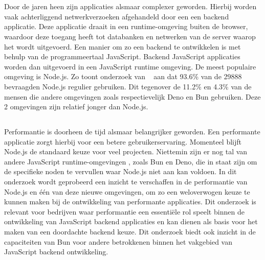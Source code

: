
\chapter{}%
\label{ch:inleiding}


Door de jaren heen zijn applicaties alsmaar complexer geworden. Hierbij worden vaak achterliggend netwerkverzoeken afgehandeld door een 
een backend applicatie. Deze applicatie draait in een runtime-omgeving buiten de browser, 
waardoor deze toegang heeft tot databanken en netwerken van de server waarop het wordt uitgevoerd.
Een manier om zo een backend te ontwikkelen is met behulp van de programmeertaal JavaScript. 
Backend JavaScript applicaties worden dan uitgevoerd in een JavaScript runtime omgeving.
De meest populaire omgeving is Node.js. Zo toont onderzoek van ~\textcite{Greif2022} aan dat 93.6\% van de 29888 bevraagden Node.js 
regulier gebruiken.
Dit tegenover de 11.2\% en 4.3\% van de mensen die andere omgevingen zoals respectievelijk Deno en Bun gebruiken.
Deze 2 omgevingen zijn relatief jonger dan Node.js.

\section{}%
\label{sec:probleemstelling}

Performantie is doorheen de tijd alsmaar belangrijker geworden. 
Een performante applicatie zorgt hierbij voor een betere gebruikerservaring. 
Momenteel blijft Node.js de standaard keuze voor veel projecten. Niettemin zijn er nog tal van andere JavaScript runtime-omgevingen
, zoals Bun en Deno, die in staat zijn om de specifieke noden te vervullen waar Node.js niet aan kan voldoen. In dit onderzoek wordt geprobeerd 
een inzicht te verschaffen in de performantie van Node.js en één van deze nieuwe omgevingen,
om zo een weloverwogen keuze te kunnen maken bij de ontwikkeling van performante applicaties.
Dit onderzoek is relevant voor bedrijven waar performantie een essentiële rol speelt binnen de ontwikkeling van JavaScript backend applicaties en kan dienen als basis 
voor het maken van een doordachte backend keuze. Dit onderzoek 
biedt ook inzicht in de capaciteiten van Bun voor andere betrokkenen binnen het vakgebied van JavaScript backend ontwikkeling.

